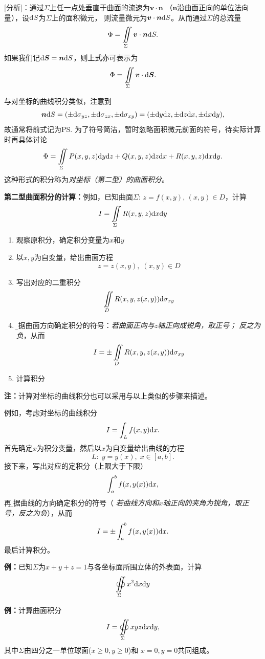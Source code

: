 [分析]：通过$\Sigma$上任一点处垂直于曲面的流速为$\bm{v}\cdot\bm{n}$
（$\bm{n}$沿曲面正向的单位法向量），设$\mathrm{d} S$为$\Sigma$上的面积微元，
则流量微元为$\bm{v}\cdot\bm{n}\mathrm{d} S$。从而通过$\Sigma$的总流量
$$\Phi=\iint\limits_{\Sigma}\bm{v}\cdot\bm{n}\mathrm{d} S.$$
如果我们记$\mathrm{d}\bm{S}=\bm{n}\mathrm{d} S$，则上式亦可表示为
$$\Phi=\iint\limits_{\Sigma}\bm{v}\cdot\mathrm{d}\bm{S}.$$

与对坐标的曲线积分类似，注意到
$$\bm{n}\mathrm{d} S=(\pm\mathrm{d}\sigma_{yz},\pm\mathrm{d}\sigma_{zx},\pm\mathrm{d}\sigma_{xy})
=(\pm\mathrm{d} y\mathrm{d} z,\pm\mathrm{d} z\mathrm{d} x,\pm\mathrm{d} x\mathrm{d} y),$$
故通常将前式记为\ps{为了符号简洁，暂时忽略面积微元前面的符号，待实际计算时再具体讨论}
$${\Phi=\iint\limits_{\Sigma}P(x,y,z)\mathrm{d} y\mathrm{d} z
+Q(x,y,z)\mathrm{d} z\mathrm{d} x+R(x,y,z)\mathrm{d} x\mathrm{d} y}.$$
这种形式的积分称为{\it 对坐标（第二型）的曲面积分}。

\begin{thx}
	{\bf 第二型曲面积分的计算：}例如，已知曲面$\Sigma:\,z=f(x,y),\,(x,y)\in D$，计算
	$$I=\iint\limits_{\Sigma}R(x,y,z)\mathrm{d} x\mathrm{d} y$$	
	\begin{enumerate}[Step-1\;]
	  \item 观察原积分，确定积分变量为$x$和$y$
	  \item 以$x,y$为自变量，给出曲面方程
	  $$z=z(x,y),\;(x,y)\in D$$ 
	  \item 写出对应的二重积分
	  $$\iint\limits_DR(x,y,z(x,y))\mathrm{d}\sigma_{xy}$$
	  \item {\b 根据曲面方向确定积分的符号}：{\it 若曲面正向与$z$轴正向成锐角，取正号；
	  反之为负}，从而
	  $${I=\pm\iint\limits_DR(x,y,z(x,y))\mathrm{d}\sigma_{xy}}$$
	  \item 计算积分
	\end{enumerate}
\end{thx}

{\bf 注：}计算对坐标的曲线积分也可以采用与以上类似的步骤来描述。

例如，考虑对坐标的曲线积分
$$I=\int_Lf(x,y)\mathrm{d} x.$$
首先确定$x$为积分变量，然后以$x$为自变量给出曲线的方程
$$L:\;y=y(x),\;x\in[a,b].$$
接下来，写出对应的定积分（上限大于下限）
$$\int_a^bf(x,y(x))\mathrm{d} x,$$
再{\b 根据曲线的方向确定积分的符号}（
{\it 若曲线方向和$x$轴正向的夹角为锐角，取正号，反之为负}），从而
$$I=\pm\int_a^bf(x,y(x))\mathrm{d} x.$$
最后计算积分。

{\bf 例：}已知$\Sigma$为$x+y+z=1$与各坐标面所围立体的外表面，计算
$$\oiint\limits_{\Sigma}x^2\mathrm{d} x\mathrm{d} y$$

{\bf 例：}计算曲面积分
$$I=\oiint\limits_{\Sigma}xyz\mathrm{d} x\mathrm{d} y,$$
其中$\Sigma$由四分之一单位球面($x\geq 0,y\geq 0$)和
$x=0,y=0$共同组成。

